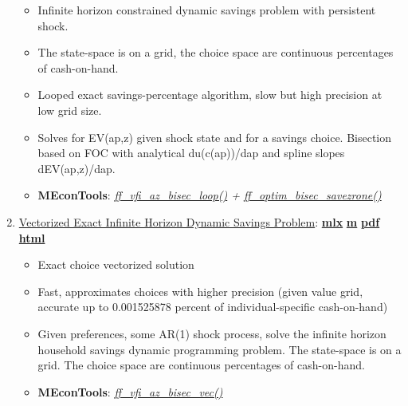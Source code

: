 \documentclass[
]{book}
\providecommand{\tightlist}{%
  \setlength{\itemsep}{0pt}\setlength{\parskip}{0pt}}
\begin{document}
\begin{enumerate}
  \begin{itemize}
  \tightlist
  \item
    Infinite horizon constrained dynamic savings problem with persistent shock.
  \item
    The state-space is on a grid, the choice space are continuous percentages of cash-on-hand.
  \item
    Looped exact savings-percentage algorithm, slow but high precision at low grid size.
  \item
    Solves for EV(ap,z) given shock state and for a savings choice. Bisection based on FOC with analytical du(c(ap))/dap and spline slopes dEV(ap,z)/dap.
  \item
    \textbf{MEconTools}: \emph{\href{https://github.com/FanWangEcon/MEconTools/blob/master/MEconTools/vfi/ff_vfi_az_bisec_loop.m}{ff\_vfi\_az\_bisec\_loop()} + \href{https://github.com/FanWangEcon/MEconTools/blob/master/MEconTools/optim/ff_optim_bisec_savezrone.m}{ff\_optim\_bisec\_savezrone()}}
  \end{itemize}
\item
  \href{https://fanwangecon.github.io/MEconTools/MEconTools/doc/vfi/htmlpdfm/fx_vfi_az_bisec_vec.html}{Vectorized Exact Infinite Horizon Dynamic Savings Problem}: \href{https://github.com/FanWangEcon/MEconTools/blob/master/MEconTools/doc/vfi/fx_vfi_az_bisec_vec.mlx}{\textbf{mlx}} \textbar{} \href{https://github.com/FanWangEcon/MEconTools/blob/master/MEconTools/doc/vfi/htmlpdfm/fx_vfi_az_bisec_vec.m}{\textbf{m}} \textbar{} \href{https://github.com/FanWangEcon/MEconTools/blob/master/MEconTools/doc/vfi/htmlpdfm/fx_vfi_az_bisec_vec.pdf}{\textbf{pdf}} \textbar{} \href{https://fanwangecon.github.io/MEconTools/MEconTools/doc/vfi/htmlpdfm/fx_vfi_az_bisec_vec.html}{\textbf{html}}

  \begin{itemize}
  \tightlist
  \item
    Exact choice vectorized solution
  \item
    Fast, approximates choices with higher precision (given value grid, accurate up to 0.001525878 percent of individual-specific cash-on-hand)
  \item
    Given preferences, some AR(1) shock process, solve the infinite horizon household savings dynamic programming problem. The state-space is on a grid. The choice space are continuous percentages of cash-on-hand.
  \item
    \textbf{MEconTools}: \emph{\href{https://github.com/FanWangEcon/MEconTools/blob/master/MEconTools/vfi/ff_vfi_az_bisec_vec.m}{ff\_vfi\_az\_bisec\_vec()}}
  \end{itemize}
\end{enumerate}
\end{document}
